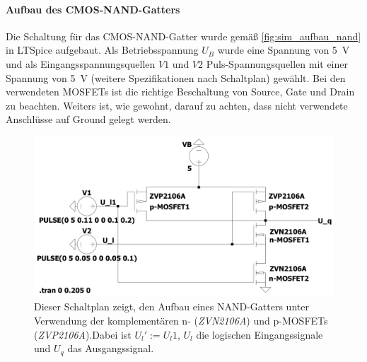 \documentclass[12pt,english,ngerman]{scrartcl}
\begin{document}
\paragraph{Aufbau des CMOS-NAND-Gatters}
Die Schaltung für das CMOS-NAND-Gatter wurde gemäß \autoref{fig:sim_aufbau_nand} in LTSpice aufgebaut.
Als Betriebsspannung $U_B$ wurde eine Spannung von \SI{5}{\volt} und als Eingangsspannungsquellen $V1$
und $V2$
Puls-Spannungsquellen mit einer Spannung von \SI{5}{\volt} (weitere Spezifikationen nach Schaltplan) gewählt.
Bei den verwendeten MOSFETs ist die richtige Beschaltung von Source, Gate und Drain zu beachten.
Weiters ist, wie gewohnt, darauf zu achten, dass nicht verwendete Anschlüsse auf Ground gelegt werden.
\begin{figure}[H]
  \centering
    \includegraphics[width=\textwidth, height=6cm,keepaspectratio]{./simdaten_lab/cmos/nand/schaltung.png}
  \caption{Dieser Schaltplan zeigt, den Aufbau eines NAND-Gatters unter
    Verwendung der komplementären n- (\textit{ZVN2106A}) und p-MOSFETs
    (\textit{ZVP2106A}).Dabei ist $U_l':=U_l1$, $U_l$ die logischen
  Eingangssignale und $U_q$ das Ausgangssignal.}
  \label{fig:sim_aufbau_nand}
\end{figure}
\end{document}
